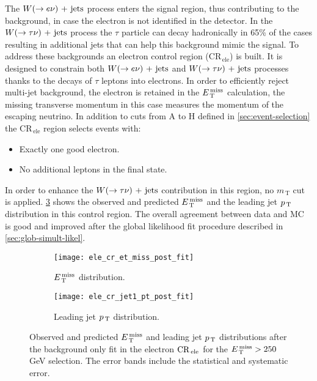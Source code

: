 The $W (\rightarrow e \nu)\mathrm{~+~jets}$ process enters the signal region, thus contributing to the
background, in case the electron is not identified in the detector. In the
$W (\rightarrow \tau \nu)\mathrm{~+~jets}$ process the $\tau$ particle can decay hadronically in 65\% of
the cases resulting in additional jets that can help this background mimic the
signal. To address these backgrounds an electron control region
(CR$_\mathrm{\, ele}$) is built. It is designed to constrain both
$W (\rightarrow e \nu)\mathrm{~+~jets}$ and $W (\rightarrow \tau \nu)\mathrm{~+~jets}$ processes thanks to the decays of $\tau$
leptons into electrons. In order to efficiently reject multi-jet background,
the electron is retained in the $E_\mathrm{\, T}^\mathrm{\, miss}$ calculation, the missing transverse
momentum in this case measures the momentum of the escaping neutrino. In
addition to cuts from A to H defined in \cref{sec:event-selection} the
CR$_\mathrm{\, ele}$ region selects events with:
\begin{itemize}
\item Exactly one good electron.
\item No additional leptons in the final state.
\end{itemize}
In order to enhance the $W (\rightarrow \tau \nu)\mathrm{~+~jets}$ contribution in this region, no
$m_\mathrm{\, T}$ cut is applied. \cref{fig:ele_cr_plots} shows the observed and
predicted $E_\mathrm{\, T}^\mathrm{\, miss}$ and the leading jet $p_\mathrm{\, T}$ distribution in this control region. The
overall agreement between data and MC is good and improved after the global
likelihood fit procedure described in \cref{sec:glob-simult-likel}.
\begin{figure}[!h]
  \centering
  \begin{subfigure}[t]{.48\linewidth}
    \texttt{[image: ele\_cr\_et\_miss\_post\_fit]}
    \caption{$E_\mathrm{\, T}^\mathrm{\, miss}$ distribution.}
    \label{fig:ele_cr_et_miss_pre_fit}
  \end{subfigure}
  \begin{subfigure}[t]{.48\linewidth}
    \texttt{[image: ele\_cr\_jet1\_pt\_post\_fit]}
    \caption{Leading jet $p_\mathrm{\, T}$ distribution.}
    \label{fig:ele_cr_jet1_pt_pre_fit}
  \end{subfigure}
  \caption{Observed and predicted $E_\mathrm{\, T}^\mathrm{\, miss}$ and leading jet $p_\mathrm{\, T}$ distributions
    after the background only fit in the electron $\mathrm{CR}_\mathrm{\, ele}$ for the
    $E_\mathrm{\, T}^\mathrm{\, miss} > 250~$GeV selection. The error bands include the statistical and
    systematic error.}
  \label{fig:ele_cr_plots}
\end{figure}
